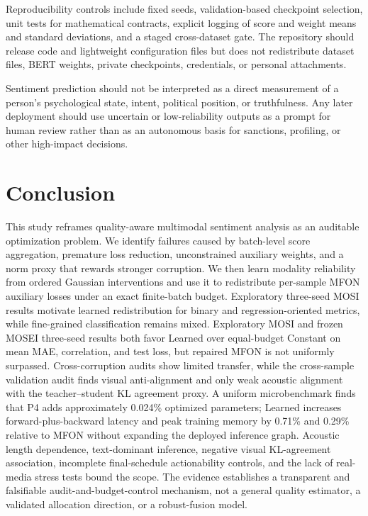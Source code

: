 Reproducibility controls include fixed seeds, validation-based
checkpoint selection, unit tests for mathematical contracts, explicit
logging of score and weight means and standard deviations, and a staged
cross-dataset gate. The repository should release code and lightweight
configuration files but does not redistribute dataset files, BERT
weights, private checkpoints, credentials, or personal attachments.

Sentiment prediction should not be interpreted as a direct measurement
of a person's psychological state, intent, political position, or
truthfulness. Any later deployment should use uncertain or
low-reliability outputs as a prompt for human review rather than as an
autonomous basis for sanctions, profiling, or other high-impact
decisions.

\section{Conclusion}\label{conclusion}

This study reframes quality-aware multimodal sentiment analysis as an
auditable optimization problem. We identify failures caused by
batch-level score aggregation, premature loss reduction, unconstrained
auxiliary weights, and a norm proxy that rewards stronger corruption. We
then learn modality reliability from ordered Gaussian interventions and use it to
redistribute per-sample MFON auxiliary losses under an exact
finite-batch budget. Exploratory three-seed MOSI results motivate learned
redistribution for binary and regression-oriented metrics, while fine-grained
classification remains mixed. Exploratory MOSI and frozen MOSEI three-seed
results both favor Learned over equal-budget Constant on mean MAE,
correlation, and test loss, but repaired MFON is not uniformly surpassed.
Cross-corruption audits show limited transfer, while the cross-sample
validation audit finds visual anti-alignment and only weak acoustic alignment
with the teacher--student KL agreement proxy. A uniform microbenchmark finds that P4 adds approximately
0.024\% optimized parameters; Learned increases forward-plus-backward latency
and peak training memory by 0.71\% and 0.29\% relative to MFON without
expanding the deployed inference graph. Acoustic length dependence,
text-dominant inference, negative visual KL-agreement association, incomplete
final-schedule actionability controls, and the lack of real-media stress tests
bound the scope. The evidence establishes a transparent and falsifiable
audit-and-budget-control mechanism, not a general quality estimator, a
validated allocation direction, or a robust-fusion model.
